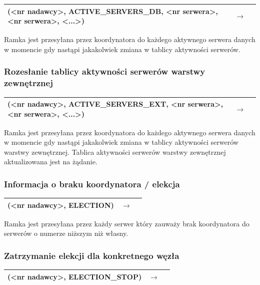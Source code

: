 \begin{longtable}{| p{} | p{}| p{} |} 
\hline
(<nr nadawcy>, ACTIVE\_SERVERS\_DB, <nr serwera>, <nr serwera>, <...>)& $\rightarrow$ &  \\ \hline
\end{longtable}

Ramka jest przesyłana przez koordynatora do każdego aktywnego serwera danych w momencie gdy nastąpi jakakolwiek zmiana w tablicy aktywności serwerów.

\subsubsection{Rozesłanie tablicy aktywności serwerów warstwy zewnętrznej}

\begin{longtable}{| p{} | p{}| p{} |} 
\hline
(<nr nadawcy>, ACTIVE\_SERVERS\_EXT, <nr serwera>, <nr serwera>, <...>)& $\rightarrow$ &  \\ \hline
\end{longtable}

Ramka jest przesyłana przez koordynatora do każdego aktywnego serwera danych w momencie gdy nastąpi jakakolwiek zmiana w tablicy aktywności serwerów warstwy zewnętrznej. Tablica aktywności serwerów warstwy zewnętrznej aktualizowana jest na żądanie.

\subsubsection{Informacja o braku koordynatora / elekcja}

\begin{longtable}{| p{} | p{}| p{} |} 
\hline
(<nr nadawcy>, ELECTION) & $\rightarrow$ &  \\ \hline
\end{longtable}

Ramka jest przesyłana przez każdy serwer który zauważy brak koordynatora do serwerów o numerze niższym niż własny.

\subsubsection{Zatrzymanie elekcji dla konkretnego węzła}

\begin{longtable}{| p{} | p{}| p{} |} 
\hline
(<nr nadawcy>, ELECTION\_STOP) & $\rightarrow$ &  \\ \hline
\end{longtable}

